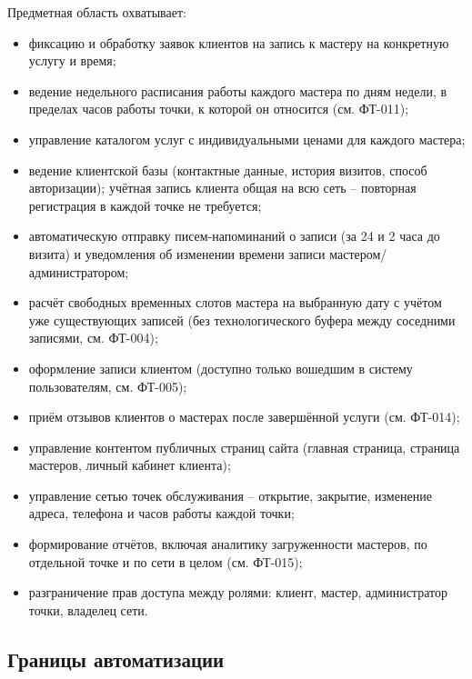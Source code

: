Предметная область охватывает:
\begin{itemize}
  \item фиксацию и обработку заявок клиентов на запись к мастеру на конкретную услугу и время;
  \item ведение недельного расписания работы каждого мастера по дням недели, в пределах часов работы точки, к которой он относится (см. ФТ-011);
  \item управление каталогом услуг с индивидуальными ценами для каждого мастера;
  \item ведение клиентской базы (контактные данные, история визитов, способ авторизации); учётная запись клиента общая на всю сеть -- повторная регистрация в каждой точке не требуется;
  \item автоматическую отправку писем-напоминаний о записи (за 24 и 2 часа до визита) и уведомления об изменении времени записи мастером/администратором;
  \item расчёт свободных временных слотов мастера на выбранную дату с учётом уже существующих записей (без технологического буфера между соседними записями, см. ФТ-004);
  \item оформление записи клиентом (доступно только вошедшим в систему пользователям, см. ФТ-005);
  \item приём отзывов клиентов о мастерах после завершённой услуги (см. ФТ-014);
  \item управление контентом публичных страниц сайта (главная страница, страница мастеров, личный кабинет клиента);
  \item управление сетью точек обслуживания -- открытие, закрытие, изменение адреса, телефона и часов работы каждой точки;
  \item формирование отчётов, включая аналитику загруженности мастеров, по отдельной точке и по сети в целом (см. ФТ-015);
  \item разграничение прав доступа между ролями: клиент, мастер, администратор точки, владелец сети.
\end{itemize}

\subsection{Границы автоматизации}

